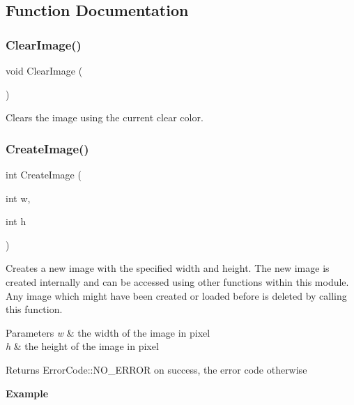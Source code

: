 \subsection{Function Documentation}
\mbox{\label{group__graphics__group_gaf45b0118bad60d88a6c50d841106bc4a}} 
\subsubsection{\texorpdfstring{Clear\+Image()}{ClearImage()}}
{\footnotesize\ttfamily void Clear\+Image (\begin{DoxyParamCaption}{ }\end{DoxyParamCaption})}

Clears the image using the current clear color. \mbox{\label{group__graphics__group_ga8462a895186f3534786c30df8fd9747e}} 
\subsubsection{\texorpdfstring{Create\+Image()}{CreateImage()}}
{\footnotesize\ttfamily int Create\+Image (\begin{DoxyParamCaption}\item[{int}]{w,  }\item[{int}]{h }\end{DoxyParamCaption})}

Creates a new image with the specified width and height. The new image is created internally and can be accessed using other functions within this module. Any image which might have been created or loaded before is deleted by calling this function.


\begin{DoxyParams}{Parameters}
{\em w} & the width of the image in pixel \\
\hline
{\em h} & the height of the image in pixel \\
\hline
\end{DoxyParams}
\begin{DoxyReturn}{Returns}
Error\+Code\+::\+N\+O\+\_\+\+E\+R\+R\+OR on success, the error code otherwise
\end{DoxyReturn}
{\bfseries Example}


